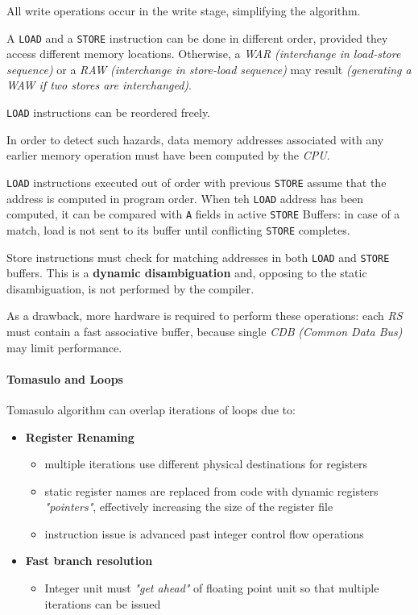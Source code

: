 \documentclass[english]{article}
\begin{document}
All write operations occur in the write stage, simplifying the algorithm.

\bigskip
A \texttt{LOAD} and a \texttt{STORE} instruction can be done in different order, provided they access different memory locations.
Otherwise, a \textit{WAR} \textit{(interchange in load-store sequence)} or a \textit{RAW} \textit{(interchange in store-load sequence)} may result \textit{(generating a \textit{WAW} if two stores are interchanged)}.

\texttt{LOAD} instructions can be reordered freely.

In order to detect such hazards, data memory addresses associated with any earlier memory operation must have been computed by the \textit{CPU}.

\bigskip
\texttt{LOAD} instructions executed out of order with previous \texttt{STORE} assume that the address is computed in program order.
When teh \texttt{LOAD} address has been computed, it can be compared with \texttt{A} fields in active \texttt{STORE} Buffers: in case of a match, load is not sent to its buffer until conflicting \texttt{STORE} completes.

Store instructions must check for matching addresses in both \texttt{LOAD} and \texttt{STORE} buffers.
This is a \textbf{dynamic disambiguation} and, opposing to the static disambiguation, is not performed by the compiler.

As a drawback, more hardware is required to perform these operations: each \textit{RS} must contain a fast associative buffer, because single \textit{CDB} \textit{(Common Data Bus)}  may limit performance.

\paragraph{Tomasulo and Loops}

Tomasulo algorithm can overlap iterations of loops due to:

\begin{itemize}
  \item \textbf{Register Renaming}
        \begin{itemize}
          \item multiple iterations use different physical destinations for registers
          \item static register names are replaced from code with dynamic registers \textit{"pointers"}, effectively increasing the size of the register file
          \item instruction issue is advanced past integer control flow operations
        \end{itemize}
  \item \textbf{Fast branch resolution}
        \begin{itemize}
          \item Integer unit must \textit{"get ahead"} of floating point unit so that multiple iterations can be issued
        \end{itemize}
\end{itemize}
\end{document}
